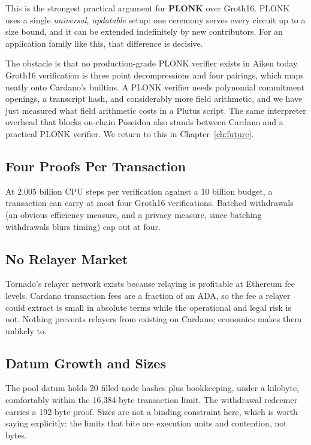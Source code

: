 This is the strongest practical argument for \textbf{PLONK} over Groth16. PLONK
uses a single \emph{universal, updatable} setup: one ceremony serves every
circuit up to a size bound, and it can be extended indefinitely by new
contributors. For an application family like this, that difference is decisive.

The obstacle is that no production-grade PLONK verifier exists in Aiken today.
Groth16 verification is three point decompressions and four pairings, which maps
neatly onto Cardano's builtins. A PLONK verifier needs polynomial commitment
openings, a transcript hash, and considerably more field arithmetic, and we
have just measured what field arithmetic costs in a Plutus script. The same
interpreter overhead that blocks on-chain Poseidon also stands between Cardano
and a practical PLONK verifier. We return to this in
Chapter~\ref{ch:future}.

\subsection*{Four Proofs Per Transaction}

At 2.005 billion CPU steps per verification against a 10 billion budget, a
transaction can carry at most four Groth16 verifications. Batched withdrawals
(an obvious efficiency measure, and a privacy measure, since batching
withdrawals blurs timing) cap out at four.

\subsection*{No Relayer Market}

Tornado's relayer network exists because relaying is profitable at Ethereum fee
levels. Cardano transaction fees are a fraction of an ADA, so the fee a relayer
could extract is small in absolute terms while the operational and legal risk is
not. Nothing prevents relayers from existing on Cardano; economics makes them
unlikely to.

\subsection*{Datum Growth and Sizes}

The pool datum holds 20 filled-node hashes plus bookkeeping, under a kilobyte,
comfortably within the 16{,}384-byte transaction limit. The withdrawal redeemer
carries a 192-byte proof. Sizes are not a binding constraint here, which is worth
saying explicitly: the limits that bite are execution units and contention, not
bytes.

